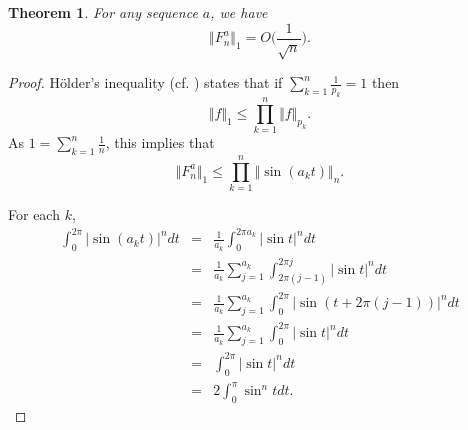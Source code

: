 \documentclass{amsart}
\newcommand{\norm}[1]{\Vert #1 \Vert}
\newtheorem{theorem}{Theorem}
\begin{document}
\begin{theorem} 
For any sequence $a$, we have
\[
\norm{F_n^a}_1 = O\Big(\frac{1}{\sqrt{n}}\Big).
\]
\label{hoelder}
\end{theorem}
\begin{proof}
H\"older's inequality \cite[p.~45, Theorem 2.3]{lieb} (cf. \cite[p.~151, Exercise 9.9]{master}) states
that if $\sum_{k=1}^n \frac{1}{p_k}=1$ then
\[
\norm{f}_1 \leq \prod_{k=1}^n \norm{f}_{p_k}.
\]
As $1=\sum_{k=1}^n \frac{1}{n}$, this implies that
\[
\norm{F_n^a}_1 \leq \prod_{k=1}^n \norm{\sin (a_k t)}_n.
\]

For each $k$,
\begin{eqnarray*}
\int_0^{2\pi} |\sin (a_k t)|^n dt&=&\frac{1}{a_k} \int_0^{2\pi a_k} |\sin t|^n dt\\
&=&\frac{1}{a_k} \sum_{j=1}^{a_k} \int_{2\pi(j-1)}^{2\pi j} |\sin t|^n dt\\
&=&\frac{1}{a_k}\sum_{j=1}^{a_k} \int_0^{2\pi} |\sin(t+2\pi (j-1))|^n dt\\
&=&\frac{1}{a_k}\sum_{j=1}^{a_k} \int_0^{2\pi} |\sin t|^n dt\\
&=&\int_0^{2\pi} |\sin t|^n dt\\
&=&2\int_0^\pi \sin^n t dt.
\end{eqnarray*}


\end{proof}
\end{document}
